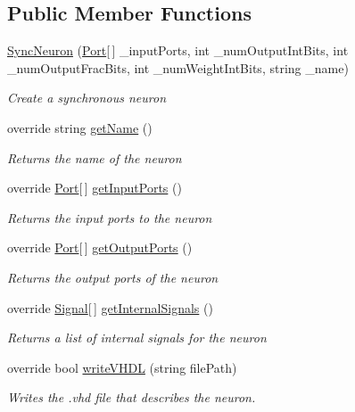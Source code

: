 \subsection*{Public Member Functions}
\begin{DoxyCompactItemize}
\item 
\hyperlink{class_n_n_gen_1_1_sync_neuron_a500526443c9e0009cc7aa9f678795bfb}{Sync\+Neuron} (\hyperlink{class_n_n_gen_1_1_port}{Port}\mbox{[}$\,$\mbox{]} \+\_\+input\+Ports, int \+\_\+num\+Output\+Int\+Bits, int \+\_\+num\+Output\+Frac\+Bits, int \+\_\+num\+Weight\+Int\+Bits, string \+\_\+name)
\begin{DoxyCompactList}\small\item\em Create a synchronous neuron \end{DoxyCompactList}\item 
override string \hyperlink{class_n_n_gen_1_1_sync_neuron_a0d24dc5f802b28e58318bbc70e4e999a}{get\+Name} ()
\begin{DoxyCompactList}\small\item\em Returns the name of the neuron \end{DoxyCompactList}\item 
override \hyperlink{class_n_n_gen_1_1_port}{Port}\mbox{[}$\,$\mbox{]} \hyperlink{class_n_n_gen_1_1_sync_neuron_a9f391d4a186cdd79f97ece5adab9ff6c}{get\+Input\+Ports} ()
\begin{DoxyCompactList}\small\item\em Returns the input ports to the neuron \end{DoxyCompactList}\item 
override \hyperlink{class_n_n_gen_1_1_port}{Port}\mbox{[}$\,$\mbox{]} \hyperlink{class_n_n_gen_1_1_sync_neuron_a79f19432c86cbaf3a2eaa2090cecf9cf}{get\+Output\+Ports} ()
\begin{DoxyCompactList}\small\item\em Returns the output ports of the neuron \end{DoxyCompactList}\item 
override \hyperlink{class_n_n_gen_1_1_signal}{Signal}\mbox{[}$\,$\mbox{]} \hyperlink{class_n_n_gen_1_1_sync_neuron_a615a906839d1227ca0e4605b4165f892}{get\+Internal\+Signals} ()
\begin{DoxyCompactList}\small\item\em Returns a list of internal signals for the neuron \end{DoxyCompactList}\item 
override bool \hyperlink{class_n_n_gen_1_1_sync_neuron_aebc20821885a0661e98403b4a7722643}{write\+V\+H\+D\+L} (string file\+Path)
\begin{DoxyCompactList}\small\item\em Writes the .vhd file that describes the neuron. \end{DoxyCompactList}\end{DoxyCompactItemize}
